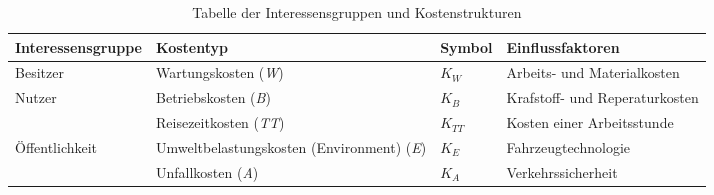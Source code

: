 %
%
%
%

\begin{table}[h!]
\flushleft
\renewcommand{\arraystretch}{1.3}

%
%
\begin{tabular}{@{}p{3.3cm} p{4cm} p{1.2cm} l @{}} \\   
\toprule
\textbf{Interessensgruppe} & \textbf{Kostentyp} & \textbf{Symbol} & \textbf{Einflussfaktoren} 			\\
\midrule
Besitzer                   & Wartungskosten (\textit{W})                    		& $K_{W}$    & Arbeits- und Materialkosten              \\
Nutzer		               & Betriebskosten (\textit{B})                     		& $K_{B}$    & Krafstoff- und Reperaturkosten                     \\
                           & Reisezeitkosten (\textit{TT})            		 		& $K_{TT}$   & Kosten einer Arbeitsstunde   \\
Öffentlichkeit           & Umweltbelastungskosten \newline (Environment) (\textit{E}) & $K_{E}$  &  Fahrzeugtechnologie      \\
                           & Unfallkosten (\textit{A})                       		& $K_{A}$    & Verkehrssicherheit    \\
\bottomrule

\end{tabular}
\caption{Tabelle der Interessensgruppen und Kostenstrukturen}
\label{tab:t-04-01-Interessensgruppen}
\end{table}


%


